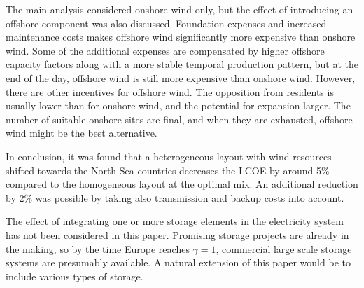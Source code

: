 \documentclass[a4paper, 5p, sort&compress]{elsarticle}%
\begin{document}
The main analysis considered onshore wind only, but the effect of
introducing an offshore component was also discussed. Foundation
expenses and increased maintenance costs makes offshore wind
significantly more expensive than onshore wind. Some of the additional
expenses are compensated by higher offshore capacity factors along
with a more stable temporal production pattern, but at the end of the
day, offshore wind is still more expensive than onshore wind. However,
there are other incentives for offshore wind. The opposition from
residents is usually lower than for onshore wind, and the potential
for expansion larger. The number of suitable onshore sites are final,
and when they are exhausted, offshore wind might be the best
alternative.

In conclusion, it was found that a heterogeneous layout with wind
resources shifted towards the North Sea countries decreases the LCOE
by around 5\% compared to the homogeneous layout at the optimal mix. An
additional reduction by 2\% was possible by taking also transmission
and backup costs into account. \newline

The effect of integrating one or more storage elements in the
electricity system has not been considered in this paper. Promising
storage projects are already in the making, so by the time Europe reaches
$\gamma = 1$, commercial large scale storage systems are presumably
available. A natural extension of this paper would be to include
various types of storage.



\end{document}
